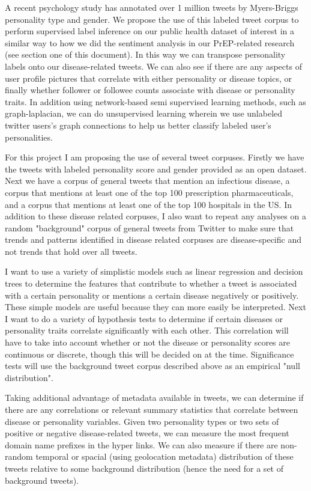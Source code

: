 A recent psychology study has annotated over 1 million tweets by Myers-Briggs personality type and gender\cite{plank2015personality}. We propose the use of this labeled tweet corpus to perform supervised label inference on our public health dataset of interest in a similar way to how we did the sentiment analysis in our PrEP-related research (see section one of this document). In this way we can transpose personality labels onto our disease-related tweets.  We can also see if there are any aspects of user profile pictures that correlate with either personality or disease topics, or finally whether follower or followee counts associate with disease or personality traits. In addition using network-based semi supervised learning methods, such as graph-laplacian\cite{sindhwani2005beyond}, we can do unsupervised learning wherein we use unlabeled twitter users's graph connections to help us better classify labeled user's personalities.

For this project I am proposing the use of several tweet corpuses. Firstly we have the tweets with labeled personality score and gender provided as an open dataset\cite{plank2015personality}. Next we have a corpus of general tweets that mention an infectious disease, a corpus that mentions at least one of the top 100 prescription pharmaceuticals, and a corpus that mentions at least one of the top 100 hospitals in the US. In addition to these disease related corpuses, I also want to repeat any analyses on a random "background" corpus of general tweets from Twitter to make sure that trends and patterns identified in disease related corpuses are disease-specific and not trends that hold over all tweets.

I want to use a variety of simplistic models such as linear regression and decision trees to determine the features that contribute to whether a tweet is associated with a certain personality or mentions a certain disease negatively or positively. These simple models are useful because they can more easily be interpreted. Next I want to do a variety of hypothesis tests to determine if certain diseases or personality traits correlate significantly with each other. This correlation will have to take into account whether or not the disease or personality scores are continuous or discrete, though this will be decided on at the time. Significance tests will use the background tweet corpus described above as an empirical "null distribution".

Taking additional advantage of metadata available in tweets, we can determine if there are any correlations or relevant summary statistics that correlate between disease or personality variables. Given two personality types or two sets of positive or negative disease-related tweets, we can measure the most frequent domain name prefixes in the hyper links. We can also measure if there are non-random temporal or spacial (using geolocation metadata) distribution of these tweets relative to some background distribution (hence the need for a set of background tweets).

